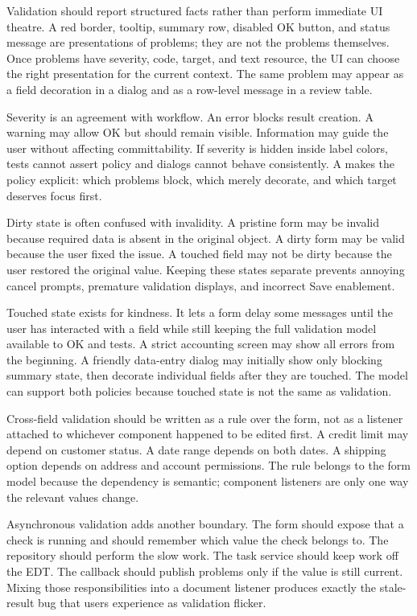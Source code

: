Validation should report structured facts rather than perform immediate UI
theatre. A red border, tooltip, summary row, disabled OK button, and status
message are presentations of problems; they are not the problems themselves.
Once problems have severity, code, target, and text resource, the UI can choose
the right presentation for the current context. The same problem may appear as a
field decoration in a dialog and as a row-level message in a review table.

Severity is an agreement with workflow. An error blocks result creation. A
warning may allow OK but should remain visible. Information may guide the user
without affecting committability. If severity is hidden inside label colors,
tests cannot assert policy and dialogs cannot behave consistently. A
 makes the policy explicit: which problems block, which merely
decorate, and which target deserves focus first.

Dirty state is often confused with invalidity. A pristine form may be invalid
because required data is absent in the original object. A dirty form may be
valid because the user fixed the issue. A touched field may not be dirty because
the user restored the original value. Keeping these states separate prevents
annoying cancel prompts, premature validation displays, and incorrect Save
enablement.

Touched state exists for kindness. It lets a form delay some messages until the
user has interacted with a field while still keeping the full validation model
available to OK and tests. A strict accounting screen may show all errors from
the beginning. A friendly data-entry dialog may initially show only blocking
summary state, then decorate individual fields after they are touched. The model
can support both policies because touched state is not the same as validation.

Cross-field validation should be written as a rule over the form, not as a
listener attached to whichever component happened to be edited first. A credit
limit may depend on customer status. A date range depends on both dates. A
shipping option depends on address and account permissions. The rule belongs to
the form model because the dependency is semantic; component listeners are only
one way the relevant values change.

Asynchronous validation adds another boundary. The form should expose that a
check is running and should remember which value the check belongs to. The
repository should perform the slow work. The task service should keep work off
the EDT. The callback should publish problems only if the value is still
current. Mixing those responsibilities into a document listener produces exactly
the stale-result bug that users experience as validation flicker.

